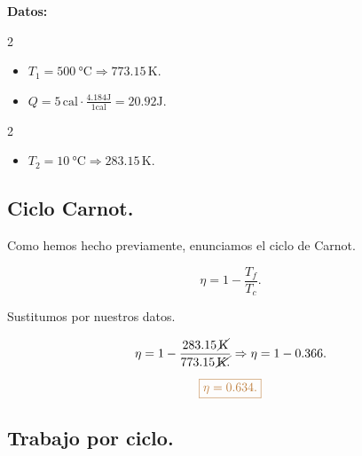 \documentclass[a4paper,12pt]{article} %
\begin{document}
\vspace{\baselineskip}

\begin{justify}
    \textbf{Datos:}
\end{justify}

\begin{multicols}{2}
    \begin{itemize}
        \item \( T_1 = \SI{500}{\degreeCelsius} \Rightarrow 773.15 \, \mathrm{K}. \)
        \item \( Q = 5 \, \mathrm{cal} \cdot \frac{4.184 \mathrm{J}}{1 \mathrm{cal}} = 20.92 \mathrm{J}. \)
    \end{itemize}
\end{multicols}

\begin{multicols}{2}
    \begin{itemize}
        \item \( T_2 = \SI{10}{\degreeCelsius} \Rightarrow 283.15 \, \mathrm{K}. \)
    \end{itemize}
\end{multicols}

\vspace{\baselineskip}

\subsection{Ciclo Carnot.}

\begin{justify}
    Como hemos hecho previamente, enunciamos el ciclo de Carnot.
\end{justify}

\[ \eta = 1 - \frac{T_f}{T_c}. \]

\begin{justify}
    Sustitumos por nuestros datos.
\end{justify}

\[ \eta = 1 - \frac{283.15 \, \cancel{\mathrm{K}}}{773.15  \, \cancel{\mathrm{K}. }} \Rightarrow \eta = 1 - 0.366. \]

\vspace{\baselineskip}

\[ \textcolor{brown}{ \boxed{ \eta = 0.634 .} } \]

\vspace{\baselineskip}

\subsection{Trabajo por ciclo.}
\end{document}
